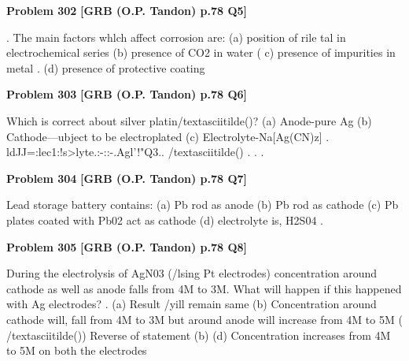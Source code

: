 \begin{problembox}
\textbf{Problem 302} \hfill \textbf{[GRB (O.P. Tandon) p.78 Q5]}
\label{q:ext-grb_all_questions-302}

. The main factors whlch affect corrosion are: 
(a) position of rile tal in electrochemical series 
(b) presence of CO2 in water 
( c) presence of impurities in metal 
. (d) presence of protective coating
\end{problembox}

\begin{problembox}
\textbf{Problem 303} \hfill \textbf{[GRB (O.P. Tandon) p.78 Q6]}
\label{q:ext-grb_all_questions-303}

Which is correct about silver platin/textasciitilde()? 
(a) Anode-pure Ag 
(b) Cathode---ubject to be electroplated 
(c) Electrolyte-Na[Ag(CN)z] 
\underline{\hspace{1cm}} . \underline{\hspace{1cm}}ldJJ=:lec1:!s>lyte.:-::-.Agl'!"Q3.\underline{\hspace{1cm}}. \underline{\hspace{1cm}} /textasciitilde() \underline{\hspace{1cm}} . \underline{\hspace{1cm}} . \underline{\hspace{1cm}}. \underline{\hspace{1cm}} \underline{\hspace{1cm}}
\end{problembox}

\begin{problembox}
\textbf{Problem 304} \hfill \textbf{[GRB (O.P. Tandon) p.78 Q7]}
\label{q:ext-grb_all_questions-304}

Lead storage battery contains: 
(a) Pb rod as anode 
(b) Pb rod as cathode 
(c) Pb plates coated with Pb02 act as cathode 
(d) electrolyte is, H2S04 
.
\end{problembox}

\begin{problembox}
\textbf{Problem 305} \hfill \textbf{[GRB (O.P. Tandon) p.78 Q8]}
\label{q:ext-grb_all_questions-305}

During the electrolysis of AgN03 (/lsing Pt electrodes) 
concentration around cathode as well as anode falls from 4M 
to 3M. What will happen if this happened with Ag electrodes? 
. (a) Result /yill remain same 
(b) Concentration around cathode will, fall from 4M to 3M 
but around anode will increase from 4M to 5M 
( /textasciitilde()) Reverse of statement (b) 
(d) Concentration increases from 4M to 5M on both the 
electrodes
\end{problembox}

